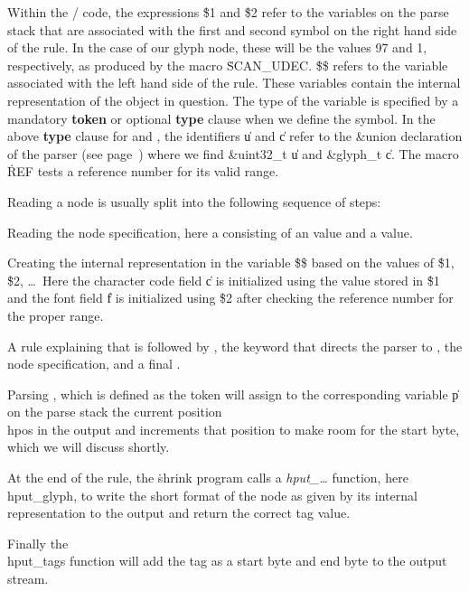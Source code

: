 Within the \CEE/ code, the expressions \.{\$1} and \.{\$2} refer to the variables on the parse stack
that are associated with the first and second symbol on the right hand side of the rule.
In the case of our glyph node, these will be the values 97 and 1, respectively, as produced
by the macro \.{SCAN\_UDEC}.
\.{\$\$} refers to the variable associated with the left hand side of the rule.
These variables contain the internal representation of the object in question.
The type of the variable is specified by a mandatory {\bf token} or optional {\bf type} clause
when we define the symbol.
In the above {\bf type} clause for  and  , the identifiers \|u and \|c refer to
the \&{union} declaration of the parser (see page~\pageref{union})
where we find \&{uint32\_t} \|u and \&{glyph\_t} \|c. The macro \.{REF} tests a reference number for
its valid range.


Reading a node is usually split into the following sequence of steps:
\itemize
\item Reading the node specification, here a 
consisting of an  value and a  value.
\item Creating the internal representation in the variable \.{\$\$}
based on the values of \.{\$1}, \.{\$2}, \dots\ Here the character
code field \|c is initialized using  the  value
stored in \.{\$1} and the font field \|f is initialized using
\.{\$2} after checking the reference number for the proper range.
\item A  rule explaining that  is followed by ,
the keyword that directs the parser  to , the
node specification, and a final .
\item Parsing , which is defined as the token  will assign
to the corresponding variable \|p on the parse stack the current
position \\{hpos} in the output and increments that position
to make room for the start byte, which we will discuss shortly.
\item At the end of the  rule, the \.{shrink} program calls
a {\it hput\_\dots\/} function, here \\{hput\_glyph}, to write the short
format of the node as given by its internal representation to the output
and return the correct tag value.
\item Finally the \\{hput\_tags} function will add the tag as a start byte and end byte
to the output stream.
\enditemize

